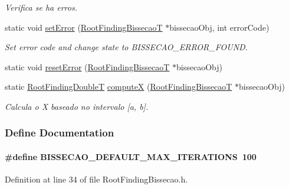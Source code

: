 \begin{CompactItemize}
\begin{CompactList}\small\item\em Verifica se ha erros. \item\end{CompactList}\item 
static void \hyperlink{group____bissecao_g35fd0bd3c36285504bfc64f6a4fc2727}{setError} (\hyperlink{structRootFindingBissecao}{RootFindingBissecaoT} $\ast$bissecaoObj, int errorCode)
\begin{CompactList}\small\item\em Set error code and change state to BISSECAO\_\-ERROR\_\-FOUND. \item\end{CompactList}\item 
static void \hyperlink{group____bissecao_g4dc0dd2ead3960f74572fc6d3afbe8a7}{resetError} (\hyperlink{structRootFindingBissecao}{RootFindingBissecaoT} $\ast$bissecaoObj)
\item 
static \hyperlink{RootFindingCommon_8h_a296fe63994e03408c4ad62794d472e9}{RootFindingDoubleT} \hyperlink{group____bissecao_g9edf187b4ec1c46191fc8d208f506247}{computeX} (\hyperlink{structRootFindingBissecao}{RootFindingBissecaoT} $\ast$bissecaoObj)
\begin{CompactList}\small\item\em Calcula o X baseado no intervalo \mbox{[}a, b\mbox{]}. \item\end{CompactList}\end{CompactItemize}


\subsubsection{Define Documentation}
\hypertarget{group____bissecao_g35fa37eaf728f4216a2b5b0ed5a9c685}{
\paragraph[BISSECAO\_\-DEFAULT\_\-MAX\_\-ITERATIONS]{\setlength{\rightskip}{0pt plus 5cm}\#define BISSECAO\_\-DEFAULT\_\-MAX\_\-ITERATIONS~100}\hfill}
\label{group____bissecao_g35fa37eaf728f4216a2b5b0ed5a9c685}




Definition at line 34 of file RootFindingBissecao.h.

